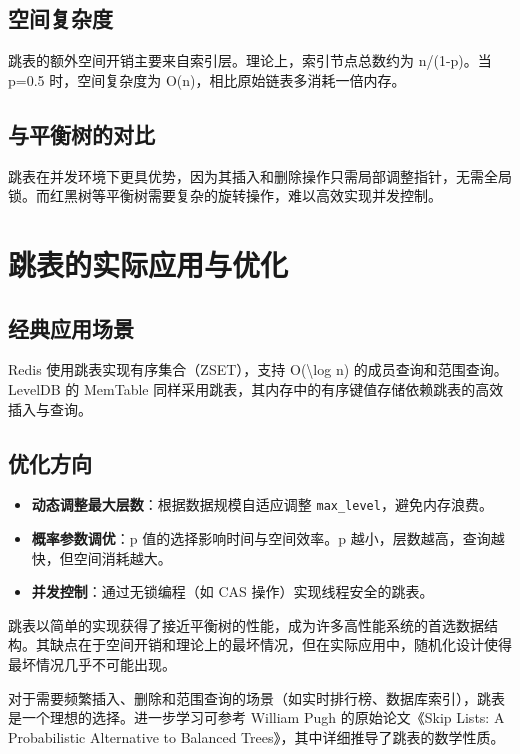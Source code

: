 \section{空间复杂度}
跳表的额外空间开销主要来自索引层。理论上，索引节点总数约为 n/(1-p)。当 p=0.5 时，空间复杂度为 O(n)，相比原始链表多消耗一倍内存。\par
\section{与平衡树的对比}
跳表在并发环境下更具优势，因为其插入和删除操作只需局部调整指针，无需全局锁。而红黑树等平衡树需要复杂的旋转操作，难以高效实现并发控制。\par
\chapter{跳表的实际应用与优化}
\section{经典应用场景}
Redis 使用跳表实现有序集合（ZSET），支持 O(\textbackslash{}log n) 的成员查询和范围查询。LevelDB 的 MemTable 同样采用跳表，其内存中的有序键值存储依赖跳表的高效插入与查询。\par
\section{优化方向}
\begin{itemize}
\item \textbf{动态调整最大层数}：根据数据规模自适应调整 \texttt{max\_{}level}，避免内存浪费。
\item \textbf{概率参数调优}：p 值的选择影响时间与空间效率。p 越小，层数越高，查询越快，但空间消耗越大。
\item \textbf{并发控制}：通过无锁编程（如 CAS 操作）实现线程安全的跳表。
\end{itemize}
跳表以简单的实现获得了接近平衡树的性能，成为许多高性能系统的首选数据结构。其缺点在于空间开销和理论上的最坏情况，但在实际应用中，随机化设计使得最坏情况几乎不可能出现。\par
对于需要频繁插入、删除和范围查询的场景（如实时排行榜、数据库索引），跳表是一个理想的选择。进一步学习可参考 William Pugh 的原始论文《Skip Lists: A Probabilistic Alternative to Balanced Trees》，其中详细推导了跳表的数学性质。\par
